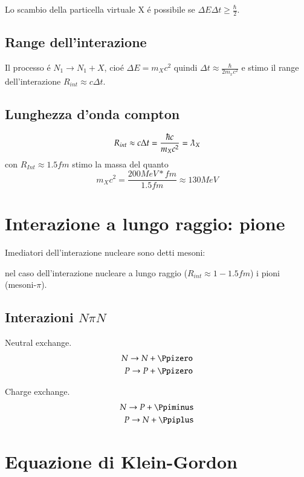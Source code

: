 \documentclass[main.tex]{subfiles}
\begin{document}
Lo scambio della particella virtuale X \'e possibile se $\Delta E\Delta t\geq\frac{\hbar}{2}$. 


\subsection{Range dell'interazione}
Il processo \'e $N_1\rightarrow N_1+X$, cio\'e $\Delta E=m_Xc^2$ quindi $\Delta t\approx\frac{\hbar}{2m_xc^2}$ e stimo il
range dell'interazione $R_{int}\approx c\Delta t$.

\subsection{Lunghezza d'onda compton}
\begin{equation*}
R_{int}\approx c\Delta t=\frac{\hbar c}{m_Xc^2}=\lambdabar_X
\end{equation*}
con $R_{Int}\approx1.5 fm$ stimo la massa del quanto
\begin{equation*}
m_Xc^2=\frac{200 MeV*fm}{1.5 fm}\approx 130 MeV
\end{equation*}

\section{Interazione a lungo raggio: pione}

Imediatori dell'interazione nucleare sono detti mesoni:

nel caso dell'interazione nucleare a lungo raggio ($R_{int}\approx1-1.5 fm$) i pioni (mesoni-$\pi$).

\subsection{Interazioni $N\pi N$}
\begin{itemize*}
\item Neutral exchange.
\begin{align*}
N\to N+\Ppizero\\
P\to P+\Ppizero
\end{align*}

\item Charge exchange.
\begin{align*}
N\to P+\Ppiminus\\
P\to N+\Ppiplus
\end{align*}

\end{itemize*}

\section{Equazione di Klein-Gordon}
\end{document}
